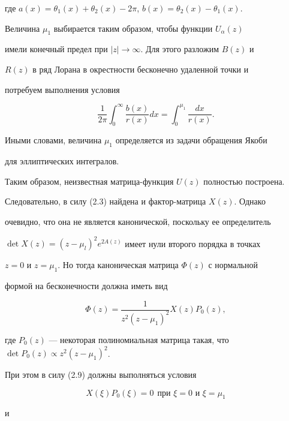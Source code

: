 где $a(x)=\theta_1(x)+\theta_2(x)-2\pi$, $b(x)=\theta_2(x)-\theta_1(x)$. 


Величина $\mu_1$ выбирается таким образом, чтобы функции $U_\alpha(z)$ 


имели конечный предел при $|z|\to\infty$. Для этого разложим $B(z)$ и 


$R(z)$ в ряд Лорана в окрестности бесконечно удаленной точки и 


потребуем выполнения условия 


$$ 


\frac{1}{2\pi}\int^\infty_0 \frac{b(x)}{r(x)}dx= 


\int^{\mu_1}_0 \frac{dx}{r(x)}. 


$$ 


Иными словами, величина $\mu_1$ определяется из задачи обращения Якоби 


для эллиптических интегралов. 


 


Таким образом, неизвестная матрица-функция $U(z)$ полностью построена. 


Следовательно, в силу (2.3) найдена и фактор-матрица $X(z)$. Однако 


очевидно, что она не является канонической, поскольку ее определитель 


$\det X(z)=(z-\mu_l)^2e^{2A(z)}$ имеет нули второго порядка в точках 


$z=0$ и $z=\mu_1$. Но тогда каноническая матрица $\Phi(z)$ с нормальной 


формой на бесконечности должна иметь вид 


\begin{equation} 


\Phi(z)=\frac{1}{z^2(z-\mu_1)^2}X(z)P_0(z), 


\end{equation} 


где $P_0(z)$ --- некоторая полиномиальная матрица такая, что $\det 


P_0(z)\propto z^2(z-\mu_1)^2$. 


При этом в силу (2.9) должны выполняться условия 


\begin{equation} 


X(\xi)P_0(\xi)=0\ \ \text{при $\xi=0$ и $\xi=\mu_1$} \tag{2.10$'$} 


\end{equation} 


и 


